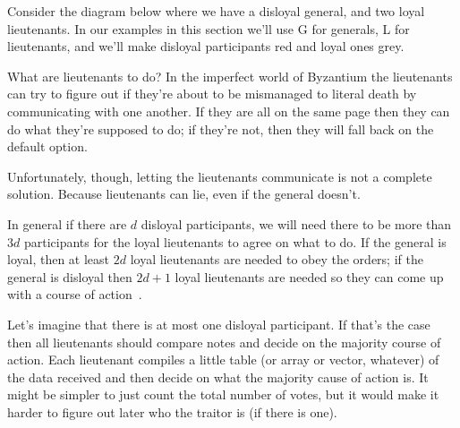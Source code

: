 Consider the  diagram below where we have a disloyal general, and two loyal lieutenants. In our examples in this section we'll use G for generals, L for lieutenants, and we'll make disloyal participants red and loyal ones grey.

\begin{center}
\end{center}

What are lieutenants to do? In the imperfect world of Byzantium the lieutenants can try to figure out if they're about to be mismanaged to literal death by communicating with one another. If they are all on the same page then they can do what they're supposed to do; if they're not, then they will fall back on the default option.

Unfortunately, though, letting the lieutenants communicate is not a complete solution. Because lieutenants can lie, even if the general doesn't.

\begin{center}
\end{center}

In general if there are $d$ disloyal participants, we will need there to be more than $3d$ participants for the loyal lieutenants to agree on what to do. If the general is loyal, then at least $2d$ loyal lieutenants are needed to obey the orders; if the general is disloyal then $2d+1$ loyal lieutenants are needed so they can come up with a course of action~\cite{mte241}.

Let's imagine that there is at most one disloyal participant. If that's the case then all lieutenants should compare notes and decide on the majority course of action. Each lieutenant compiles a little table (or array or vector, whatever) of the data received and then decide on what the majority cause of action is. It might be simpler to just count the total number of votes, but it would make it harder to figure out later who the traitor is (if there is one).

